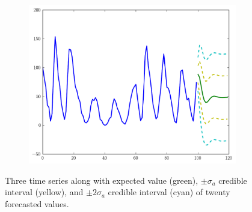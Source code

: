 \begin{figure}
        \begin{subfigure}[b]{0.7\textwidth}
                \includegraphics[width=\textwidth]{forecasted_c}
        \end{subfigure}
    \caption{Three time series along with expected value (green), $\pm \sigma_a$ credible interval (yellow),
    and $\pm 2\sigma_a$ credible interval (cyan) of twenty forecasted values.}
	\label{fig:forecasted}
\end{figure}

